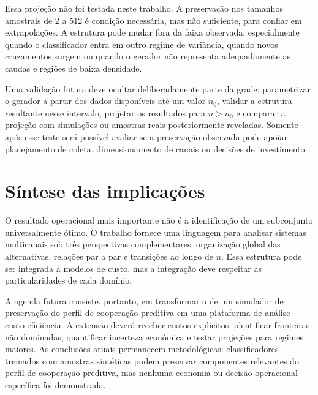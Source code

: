 Essa projeção não foi testada neste trabalho. A preservação nos tamanhos amostrais de 2 a 512 é condição necessária, mas não suficiente, para confiar em extrapolações. A estrutura pode mudar fora da faixa observada, especialmente quando o classificador entra em outro regime de variância, quando novos cruzamentos surgem ou quando o gerador não representa adequadamente as caudas e regiões de baixa densidade.

Uma validação futura deve ocultar deliberadamente parte da grade: parametrizar o gerador a partir dos dados disponíveis até um valor $n_0$, validar a estrutura resultante nesse intervalo, projetar os resultados para $n>n_0$ e comparar a projeção com simulações ou amostras reais posteriormente reveladas. Somente após esse teste será possível avaliar se a preservação observada pode apoiar planejamento de coleta, dimensionamento de canais ou decisões de investimento.

\section{Síntese das implicações}

O resultado operacional mais importante não é a identificação de um subconjunto universalmente ótimo. O trabalho fornece uma linguagem para analisar sistemas multicanais sob três perspectivas complementares: organização global das alternativas, relações par a par e transições ao longo de $n$. Essa estrutura pode ser integrada a modelos de custo, mas a integração deve respeitar as particularidades de cada domínio.

A agenda futura consiste, portanto, em transformar o \CoInfoSim{} de um simulador de preservação do perfil de cooperação preditiva em uma plataforma de análise custo-eficiência. A extensão deverá receber custos explícitos, identificar fronteiras não dominadas, quantificar incerteza econômica e testar projeções para regimes maiores. As conclusões atuais permanecem metodológicas: classificadores treinados com amostras sintéticas podem preservar componentes relevantes do perfil de cooperação preditiva, mas nenhuma economia ou decisão operacional específica foi demonstrada.
